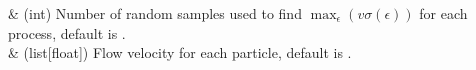 \begin{savenotes}
\begin{tabulary}{\linewidth}[t]{}
\sphinxhline
\sphinxAtStartPar
{}
&
\sphinxAtStartPar
(int) Number of random samples used to find \(\max_\epsilon (v\sigma(\epsilon))\) for each process, default is .
\\
\sphinxhline
\sphinxAtStartPar
{}
&
\sphinxAtStartPar
(list{[}float{]}) Flow velocity for each particle, default is \sphinxcode{\sphinxupquote{{[}0.0, 0.0{]}}}.
\\
\sphinxbottomrule
\end{tabulary}
\sphinxtableafterendhook\par
\sphinxattableend\end{savenotes}
